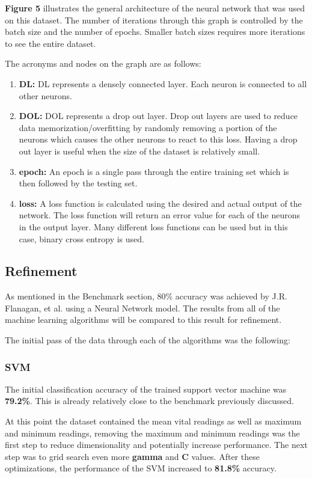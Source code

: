 \documentclass[11pt]{article}
\begin{document}
	\textbf{Figure 5} illustrates the general architecture of the neural network that was used on this dataset. The number of iterations through this graph is controlled by the batch size and the number of epochs. Smaller batch sizes requires more iterations to see the entire dataset.
	
	The acronyms and nodes on the graph are as follows:
	\begin{enumerate}
		\item \textbf{DL:} DL represents a densely connected layer. Each neuron is connected to all other neurons.
		\item \textbf{DOL:} DOL represents a drop out layer. Drop out layers are used to reduce data memorization/overfitting by randomly removing a portion of the neurons which causes the other neurons to react to this loss. Having a drop out layer is useful when the size of the dataset is relatively small.
		\item \textbf{epoch:}  An epoch is a single pass through the entire training set which is then followed by the testing set.
		\item \textbf{loss:} A loss function is calculated using the desired and actual output of the network. The loss function will return an error value for each of the neurons in the output layer. Many different loss functions can be used but in this case, binary cross entropy is used.
	\end{enumerate}

	\subsection{Refinement}
	As mentioned in the Benchmark section, 80\% accuracy was achieved by J.R. Flanagan, et al. using a Neural Network model. The results from all of the machine learning algorithms will be compared to this result for refinement.
	
	The initial pass of the data through each of the algorithms was the following:
	
	\subsubsection{SVM}
	The initial classification accuracy of the trained support vector machine was \textbf{79.2\%}. This is already relatively close to the benchmark previously discussed.
	
	At this point the dataset contained the mean vital readings as well as maximum and minimum readings, removing the maximum and minimum readings was the first step to reduce dimensionality and potentially increase performance. The next step was to grid search even more \textbf{gamma} and \textbf{C} values. After these optimizations, the performance of the SVM increased to \textbf{81.8\%} accuracy.
	
\end{document}

